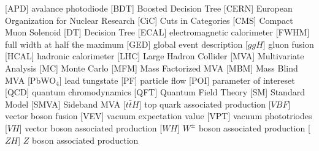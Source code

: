\begin{acronym}[AAAAAA]
 [APD] {avalance photodiode}
 [BDT] {Boosted Decision Tree}
 [CERN] {European Organization for Nuclear Research}
 [CiC] {Cuts in Categories}
 [CMS] {Compact Muon Solenoid}
 [DT] {Decision Tree}
 [ECAL] {electromagnetic calorimeter}
 [FWHM] {full width at half the maximum}
 [GED] {global event description}
 [$ggH$] {gluon fusion}
 [HCAL] {hadronic calorimeter}
 [LHC] {Large Hadron Collider}
 [MVA] {Multivariate Analysis}
 [MC] {Monte Carlo}
 [MFM] {Mass Factorized MVA}
 [MBM] {Mass Blind MVA}
 [PbWO$_{4}$] {lead tungstate}
 [PF] {particle flow}
 [POI] {parameter of intereset}
 [QCD] {quantum chromodynamics}
 [QFT] {Quantum Field Theory}
 [SM] {Standard Model}
 [SMVA] {Sideband MVA}
 [$t\bar{t}H$] {top quark associated production}
 [$VBF$] {vector boson fusion}
 [VEV] {vacuum expectation value}
 [VPT] {vacuum phototriodes}
 [$VH$] {vector boson associated production}
 [$WH$] {$W^{\pm}$ boson associated production}
 [$ZH$] {$Z$ boson associated production}
\end{acronym}



